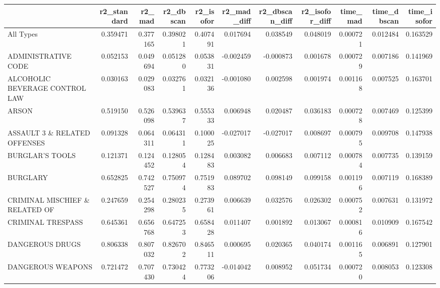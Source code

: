 \begin{tabular}{lrrrrrrrrrr}
\toprule
{} &  r2\_standard &    r2\_mad &  r2\_dbscan &  r2\_isofor &  r2\_mad\_diff &  r2\_dbscan\_diff &  r2\_isofor\_diff &  time\_mad &  time\_dbscan &  time\_isofor \\
\midrule
All Types                       &     0.359471 &  0.377165 &   0.398021 &   0.407491 &     0.017694 &        0.038549 &        0.048019 &  0.000721 &     0.012484 &     0.163529 \\
ADMINISTRATIVE CODE             &     0.052153 &  0.049694 &   0.051280 &   0.053831 &    -0.002459 &       -0.000873 &        0.001678 &  0.000729 &     0.007186 &     0.141969 \\
ALCOHOLIC BEVERAGE CONTROL LAW  &     0.030163 &  0.029083 &   0.032761 &   0.032136 &    -0.001080 &        0.002598 &        0.001974 &  0.001168 &     0.007525 &     0.163701 \\
ARSON                           &     0.519150 &  0.526098 &   0.539637 &   0.555333 &     0.006948 &        0.020487 &        0.036183 &  0.000728 &     0.007469 &     0.125399 \\
ASSAULT 3 \& RELATED OFFENSES    &     0.091328 &  0.064311 &   0.064311 &   0.100025 &    -0.027017 &       -0.027017 &        0.008697 &  0.000795 &     0.009708 &     0.147938 \\
BURGLAR'S TOOLS                 &     0.121371 &  0.124452 &   0.128054 &   0.128483 &     0.003082 &        0.006683 &        0.007112 &  0.000784 &     0.007735 &     0.139159 \\
BURGLARY                        &     0.652825 &  0.742527 &   0.750974 &   0.751983 &     0.089702 &        0.098149 &        0.099158 &  0.001196 &     0.007119 &     0.168389 \\
CRIMINAL MISCHIEF \& RELATED OF  &     0.247659 &  0.254298 &   0.280235 &   0.273961 &     0.006639 &        0.032576 &        0.026302 &  0.000752 &     0.007631 &     0.131972 \\
CRIMINAL TRESPASS               &     0.645361 &  0.656768 &   0.647253 &   0.658428 &     0.011407 &        0.001892 &        0.013067 &  0.000816 &     0.010909 &     0.167542 \\
DANGEROUS DRUGS                 &     0.806338 &  0.807032 &   0.826702 &   0.846511 &     0.000695 &        0.020365 &        0.040174 &  0.001165 &     0.006891 &     0.127901 \\
DANGEROUS WEAPONS               &     0.721472 &  0.707430 &   0.730424 &   0.773206 &    -0.014042 &        0.008952 &        0.051734 &  0.000720 &     0.008053 &     0.123308 \\

\end{tabular}
